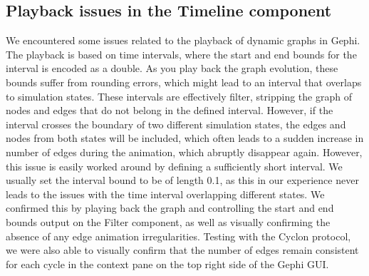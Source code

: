 \subsection{Playback issues in the Timeline component}

We encountered some issues related to the playback of dynamic
graphs in Gephi. The playback is based on time intervals, where the
start and end bounds for the interval is encoded as a double. As you
play back the graph evolution, these bounds suffer from rounding errors,
which might lead to an interval that overlaps to simulation states.
These intervals are effectively filter, stripping the graph of nodes and
edges that do not belong in the defined interval. However, if the
interval crosses the boundary of two different simulation states, the
edges and nodes from both states will be included, which often leads to
a sudden increase in number of edges during the animation, which
abruptly disappear again. However, this issue is easily worked around by
defining a sufficiently short interval. We usually set the interval
bound to be of length 0.1, as this in our experience never leads to the
issues with the time interval overlapping different states. We confirmed
this by playing back the graph and controlling the start and end bounds
output on the Filter component, as well as visually confirming the
absence of any edge animation irregularities. Testing with the Cyclon
protocol, we were also able to visually confirm that the number of edges
remain consistent for each cycle in the context pane on the top right
side of the Gephi GUI\@.

